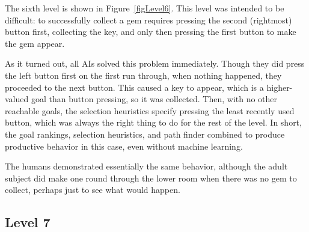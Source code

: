 \documentclass{article}
\begin{document}
The sixth level is shown in Figure~\ref{figLevel6}.  This level was intended to be difficult: to successfully collect a gem requires pressing the second (rightmost) button first, collecting the key, and only then pressing the first button to make the gem appear.

As it turned out, all AIs solved this problem immediately.  Though they did press the left button first on the first run through, when nothing happened, they proceeded to the next button.  This caused a key to appear, which is a higher-valued goal than button pressing, so it was collected.  Then, with no other reachable goals, the selection heuristics specify pressing the least recently used button, which was always the right thing to do for the rest of the level.  In short, the goal rankings, selection heuristics, and path finder combined to produce productive behavior in this case, even without machine learning.

The humans demonstrated essentially the same behavior, although the adult subject did make one round through the lower room when there was no gem to collect, perhaps just to see what would happen.

\subsection{Level 7}
\end{document}
